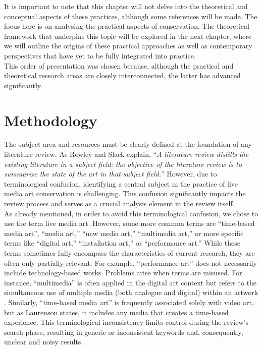 It is important to note that this chapter will not delve into the theoretical and conceptual aspects of these practices, although some references will be made. The focus here is on analysing the practical aspects of conservation. The theoretical framework that underpins this topic will be explored in the next chapter, where we will outline the origins of these practical approaches as well as contemporary perspectives that have yet to be fully integrated into practice.\\
This order of presentation was chosen because, although the practical and theoretical research areas are closely interconnected, the latter has advanced significantly.

\section{Methodology}
The subject area and resources must be clearly defined at the foundation of any literature review. As Rowley and Slack \cite{rowley2004conducting} explain, ``\textit{A literature review distills the existing literature in a subject field; the objective of the literature review is to summarize the state of the art in that subject field.}” However, due to terminological confusion, identifying a central subject in the practice of live media art conservation is challenging. This confusion significantly impacts the review process and serves as a crucial analysis element in the review itself.\\
As already mentioned, in order to avoid this terminological confusion, we chose to use the term live media art. However, some more common terms are ``time-based media art'', ``media art,'' ``new media art,'' ``multimedia art,'' or more specific terms like ``digital art,'' ``installation art,'' or ``performance art.'' While these terms sometimes fully encompass the characteristics of current research, they are often only partially relevant. For example, ``performance art'' does not necessarily include technology-based works. Problems arise when terms are misused. For instance, ``multimedia'' is often applied in the digital art context but refers to the simultaneous use of multiple media (both analogue and digital) within an artwork \cite{friedman2023intermedia}. Similarly, ``time-based media art'' is frequently associated solely with video art, but as Laurenson \cite{laurenson2001developing} states, it includes any media that creates a time-based experience. This terminological inconsistency limits control during the review’s search phase, resulting in generic or inconsistent keywords and, consequently, unclear and noisy results.\\
